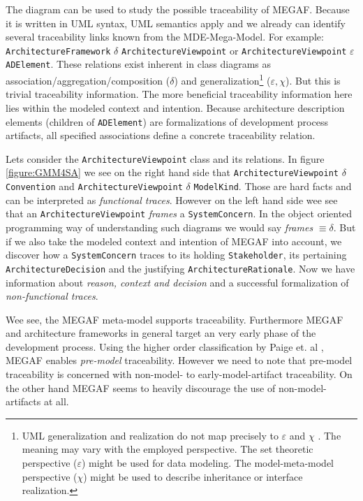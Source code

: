 The diagram can be used to study the possible traceability of MEGAF. Because it is written in UML syntax, UML semantics apply and we already can identify several traceability links known from the MDE-Mega-Model. For example:
{\small \texttt{ArchitectureFramework} $\delta$ \texttt{ArchitectureViewpoint}} or {\small \texttt{ArchitectureViewpoint} $\varepsilon$ \texttt{ADElement}}.
These relations exist inherent in class diagrams as association/aggregation/composition ($\delta$) and generalization\footnote{UML generalization and realization do not map precisely to $\varepsilon$ and $\chi$ . The meaning may vary with the employed perspective. The set theoretic perspective ($\varepsilon$) might be used for data modeling. The model-meta-model perspective ($\chi$) might be used to describe inheritance or interface realization.} ($\varepsilon, \chi$). But this is trivial traceability information. The more beneficial traceability information here lies within the modeled context and intention. Because architecture description elements (children of \texttt{ADElement}) are formalizations of development process artifacts, all specified associations define a concrete traceability relation.

Lets consider the \texttt{ArchitectureViewpoint} class and its relations. In figure \ref{figure:GMM4SA} we see on the right hand side that \texttt{ArchitectureViewpoint} $\delta$ \texttt{Convention} and \texttt{ArchitectureViewpoint} $\delta$ \texttt{ModelKind}. Those are hard facts and can be interpreted as \textit{functional traces}. However on the left hand side wee see that an \texttt{ArchitectureViewpoint} \textit{frames} a \texttt{SystemConcern}. In the object oriented programming way of understanding such diagrams we would say \textit{frames} $\equiv \delta$. But if we also take the modeled context and intention of MEGAF into account, we discover how a \texttt{SystemConcern} traces to its holding \texttt{Stakeholder}, its pertaining \texttt{ArchitectureDecision} and the justifying \texttt{ArchitectureRationale}. Now we have information about \textit{reason, context and decision} and a successful formalization of \textit{non-functional traces}.

Wee see, the MEGAF meta-model supports traceability. Furthermore MEGAF and architecture frameworks in general target an very early phase of the development process. Using the higher order classification by Paige et. al \cite{}, MEGAF enables \textit{pre-model} traceability. However we need to note that pre-model traceability is concerned with non-model- to early-model-artifact traceability. On the other hand MEGAF seems to heavily discourage the use of non-model-artifacts at all. 



